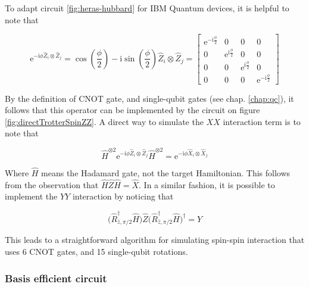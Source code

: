   To adapt circuit \ref{fig:heras-hubbard} for IBM Quantum devices, it is helpful to note that

  \begin{equation}
    \mathrm{e}^{-\mathrm{i}\phi \hat{Z}_i \otimes \hat{Z}_j} = \cos(\frac{\phi}{2}) - \mathrm{i}\sin(\frac{\phi}{2}) \hat{Z}_i \otimes \hat{Z}_j = 
    \begin{bmatrix}
      \mathrm{e}^{-\mathrm{i}\frac{\phi}{2}} & 0 & 0 & 0 \\
      0 & \mathrm{e}^{\mathrm{i}\frac{\phi}{2}} & 0 & 0 \\
      0 & 0 & \mathrm{e}^{\mathrm{i}\frac{\phi}{2}} & 0 \\
      0 & 0 & 0 & \mathrm{e}^{-\mathrm{i}\frac{\phi}{2}}
    \end{bmatrix}
    \label{eq:expZZ}
  \end{equation}

  By the definition of CNOT gate, and single-qubit gates (see chap. \ref{chap:qc}), it follows that this operator can be implemented by the circuit on figure \ref{fig:directTrotterSpinZZ}. A direct way to simulate the $XX$ interaction term is to note that

  \begin{equation}
    \hat{H}^{\otimes 2} \mathrm{e}^{-\mathrm{i}\phi \hat{Z}_i \otimes \hat{Z}_j} \hat{H}^{\otimes 2} = \mathrm{e}^{-\mathrm{i}\phi \hat{X}_i \otimes \hat{X}_j}
  \end{equation}

  Where $\hat{H}$ means the Hadamard gate, not the target Hamiltonian. This follows from the observation that $\hat{H}\hat{Z}\hat{H} = \hat{X}$. In a similar fashion, it is possible to implement the $YY$ interaction by noticing that

  \begin{equation}
    \Big(\hat{R}_{\hat{z}, \pi/2}^{\dagger}\hat{H}\Big)\hat{Z}\Big(\hat{R}_{\hat{z}, \pi/2}^{\dagger}\hat{H}\Big)^{\dagger} = \hat{Y}
  \end{equation}

  

  This leads to a straightforward algorithm for simulating spin-spin interaction that uses 6 CNOT gates, and 15 single-qubit rotations. 
  
  \subsubsection{Basis efficient circuit}

